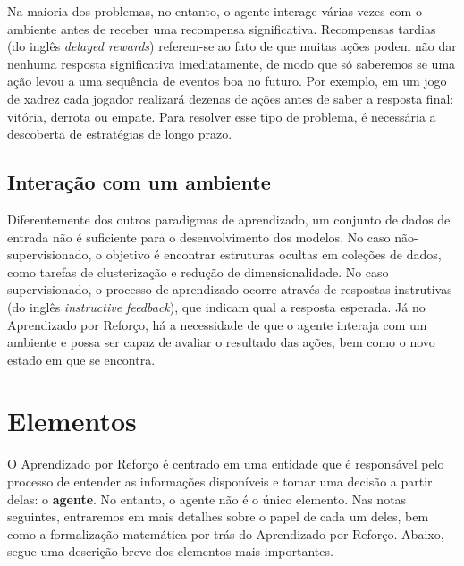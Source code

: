 \documentclass{article}
\begin{document}
                Na maioria dos problemas, no entanto, o agente interage várias vezes com o ambiente antes de receber uma recompensa significativa.
                Recompensas tardias (do inglês \emph{delayed rewards}) referem-se ao fato de que muitas ações podem não dar nenhuma resposta significativa imediatamente, de modo que só saberemos se uma ação levou a uma sequência de eventos boa no futuro.
                Por exemplo, em um jogo de xadrez cada jogador realizará dezenas de ações antes de saber a resposta final: vitória, derrota ou empate.
                Para resolver esse tipo de problema, é necessária a descoberta de estratégias de longo prazo.
        
        \subsection{Interação com um ambiente}
    
            Diferentemente dos outros paradigmas de aprendizado, um conjunto de dados de entrada não é suficiente para o desenvolvimento dos modelos.
            No caso não-supervisionado, o objetivo é encontrar estruturas ocultas em coleções de dados, como tarefas de clusterização e redução de dimensionalidade.
            No caso supervisionado, o processo de aprendizado ocorre através de respostas instrutivas (do inglês \emph{instructive feedback}), que indicam qual a resposta esperada.
            Já no Aprendizado por Reforço, há a necessidade de que o agente interaja com um ambiente e possa ser capaz de avaliar o resultado das ações, bem como o novo estado em que se encontra. 
            
    \section{Elementos}
    
        O Aprendizado por Reforço é centrado em uma entidade que é responsável pelo processo de entender as informações disponíveis e tomar uma decisão a partir delas: o \textbf{agente}.
        No entanto, o agente não é o único elemento.
        Nas notas seguintes, entraremos em mais detalhes sobre o papel de cada um deles, bem como a formalização matemática por trás do Aprendizado por Reforço.
        Abaixo, segue uma descrição breve dos elementos mais importantes.
    
\end{document}
